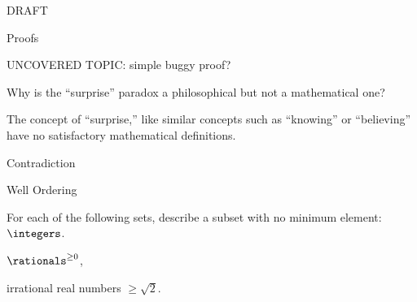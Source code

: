\documentclass[quiz]{mcs}
\begin{document}


\examspace

\begin{center}
{\Large DRAFT}
\end{center}

\begin{center}
{\large Proofs}
\end{center}

UNCOVERED TOPIC: simple buggy proof?

\begin{problem}[points = 6, title= \textbf{Surprise paradox}]
Why is the ``surprise'' paradox a philosophical but not a mathematical one?

\begin{solution}
The concept of ``surprise,'' like similar concepts such as ``knowing''
or ``believing'' have no satisfactory mathematical definitions.
\end{solution}

\end{problem}

\examspace

\begin{center}
{\large Contradiction}
\end{center}


\examspace

\begin{center}
{\large Well Ordering}
\end{center}

\begin{problem}[points = 6, title= \textbf{Minimum element sets}]
For each  of the following sets, describe a subset with no minimum element:
\bparts
\ppart $\integers$.
\examspace[0.5in]

\ppart $\rationals^{\geq 0}$,
\examspace[0.5in]

\ppart irrational real numbers $\geq \sqrt{2}$.
\examspace[0.5in]
\eparts
\end{problem}


\end{document}
